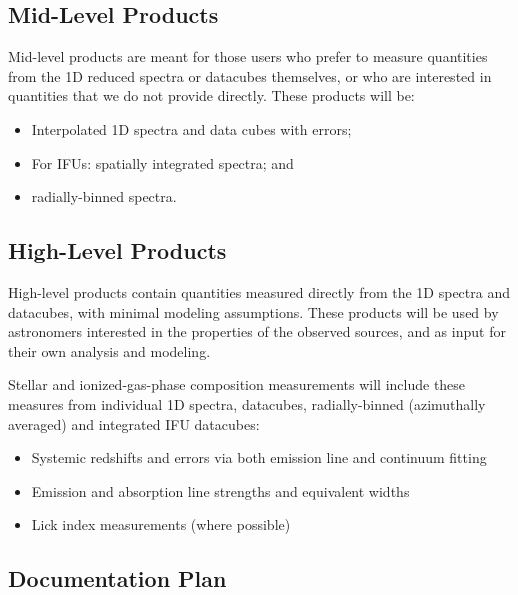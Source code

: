 \documentclass[preprint,11pt]{aastex}
\begin{document}
\subsection{Mid-Level Products} \label{sec:mid_level_products}

Mid-level products are meant for those users who prefer to measure
quantities from the 1D reduced spectra or datacubes themselves, or who are interested in
quantities that we do not provide directly. These products will be:

\begin{itemize}
  \item Interpolated 1D spectra and data cubes with errors;
  \item For IFUs: spatially integrated spectra; and
  \item radially-binned spectra.
\end{itemize}


\subsection{High-Level Products} \label{sec:high_level_products}

High-level products contain quantities measured directly from the 1D spectra and
datacubes, with minimal modeling assumptions. These products
will be used by astronomers interested in the properties of the
observed sources, and as input for their own analysis and modeling.

\medskip
\noindent Stellar and ionized-gas-phase composition measurements will include
these measures from individual 1D spectra, datacubes,
radially-binned (azimuthally averaged) and integrated IFU datacubes:

\begin{itemize}
  \item Systemic redshifts and errors via both emission line and continuum fitting
  \item Emission and absorption line strengths and equivalent widths
  \item Lick index measurements (where possible)
\end{itemize}




\subsection{Documentation Plan} \label{sec:documentation}

\end{document}
